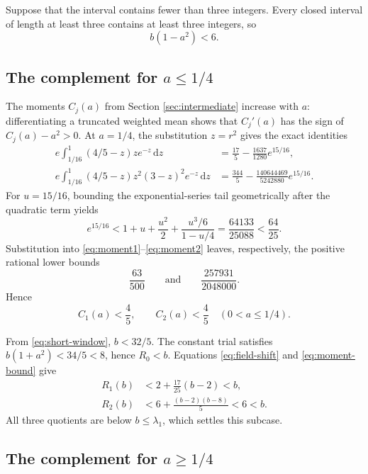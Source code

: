 \documentclass[11pt]{article}
\newcommand{\dd}{\,\mathrm d}
\begin{document}
Suppose that the interval contains fewer than three integers.  Every closed
interval of length at least three contains at least three integers, so
\begin{equation}\label{eq:short-window}
       b(1-a^2)<6.
\end{equation}

\subsection[The complement for a <= 1/4]{The complement for $a\leq1/4$}

The moments $C_j(a)$ from Section \ref{sec:intermediate} increase with $a$:
differentiating a truncated weighted mean shows that $C_j'(a)$ has the sign
of $C_j(a)-a^2>0$.  At $a=1/4$, the substitution $z=r^2$ gives the exact
identities
\begin{align}
 e\int_{1/16}^{1}(4/5-z)ze^{-z}\dd z
 &=\frac{17}{5}-\frac{1637}{1280}e^{15/16},                    \label{eq:moment1}\\
 e\int_{1/16}^{1}(4/5-z)z^2(3-z)^2e^{-z}\dd z
 &=\frac{344}{5}-\frac{140644469}{5242880}e^{15/16}.           \label{eq:moment2}
\end{align}
For $u=15/16$, bounding the exponential-series tail geometrically after the
quadratic term yields
\begin{equation}\label{eq:expbound}
 e^{15/16}<1+u+\frac{u^2}{2}
       +\frac{u^3/6}{1-u/4}
 =\frac{64133}{25088}<\frac{64}{25}.
\end{equation}
Substitution into \eqref{eq:moment1}--\eqref{eq:moment2} leaves, respectively,
the positive rational lower bounds
\[
       \frac{63}{500}\qquad\text{and}\qquad
       \frac{257931}{2048000}.
\]
Hence
\begin{equation}\label{eq:moment-bound}
       C_1(a)<\frac45,\qquad C_2(a)<\frac45
       \quad(0<a\leq1/4).
\end{equation}

From \eqref{eq:short-window}, $b<32/5$.  The constant trial satisfies
$b(1+a^2)<34/5<8$, hence $R_0<b$.  Equations
\eqref{eq:field-shift} and \eqref{eq:moment-bound} give
\begin{align*}
 R_1(b)&<2+\frac{17}{25}(b-2)<b,\\
 R_2(b)&<6+\frac{(b-2)(b-8)}5<6<b.
\end{align*}
All three quotients are below $b\leq\lambda_1$, which settles this subcase.

\subsection[The complement for a >= 1/4]{The complement for $a\geq1/4$}
\end{document}
